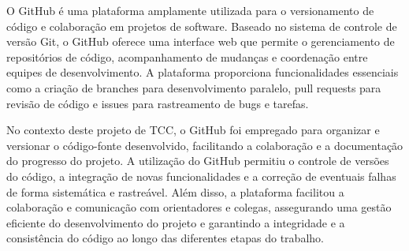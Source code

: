 O GitHub é uma plataforma amplamente utilizada para o versionamento de código e colaboração em projetos de software. Baseado no sistema de controle de versão Git, o GitHub oferece uma interface web que permite o gerenciamento de repositórios de código, acompanhamento de mudanças e coordenação entre equipes de desenvolvimento. A plataforma proporciona funcionalidades essenciais como a criação de branches para desenvolvimento paralelo, pull requests para revisão de código e issues para rastreamento de bugs e tarefas. 

No contexto deste projeto de TCC, o GitHub foi empregado para organizar e versionar o código-fonte desenvolvido, facilitando a colaboração e a documentação do progresso do projeto. A utilização do GitHub permitiu o controle de versões do código, a integração de novas funcionalidades e a correção de eventuais falhas de forma sistemática e rastreável. Além disso, a plataforma facilitou a colaboração e comunicação com orientadores e colegas, assegurando uma gestão eficiente do desenvolvimento do projeto e garantindo a integridade e a consistência do código ao longo das diferentes etapas do trabalho.